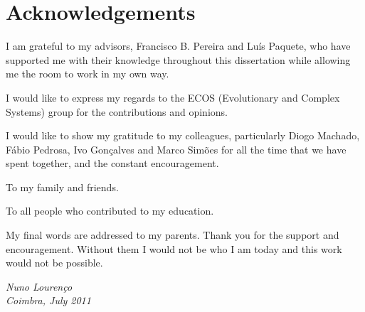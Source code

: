 \chapter*{Acknowledgements}
\renewcommand{\headrulewidth}{0pt}


I am grateful to my advisors, Francisco B. Pereira and Luís Paquete, who have supported me with their knowledge throughout this dissertation while allowing me the room to work in my own way.

I would like to express my regards to the ECOS (Evolutionary and Complex Systems) group for the contributions and opinions.

I would like to show my gratitude to my colleagues, particularly Diogo Machado, Fábio Pedrosa, Ivo Gonçalves and Marco Simões for all the time that we have spent together, and the constant encouragement.

To my family and friends.

To all people who contributed to my education.

My final words are addressed to my parents. Thank you for the support and encouragement. Without them I would not be who I am today and this work would not be possible.
\vspace{4cm}

\emph{Nuno Lourenço \\ Coimbra, July 2011}

 



